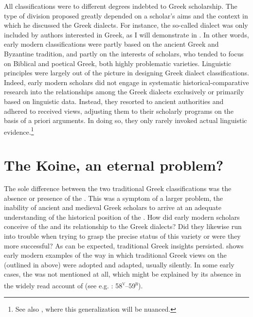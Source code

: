 All classifications were to different degrees indebted to Greek scholarship. The type of division proposed greatly depended on a scholar’s aims and the context in which he discussed the Greek dialects. For instance, the so-called  dialect was only included by authors interested in  Greek, as I will demonstrate in . In other words, early modern classifications were partly based on the ancient Greek and Byzantine tradition, and partly on the interests of scholars, who tended to focus on Biblical and poetical Greek, both highly problematic varieties. Linguistic principles were largely out of the picture in designing Greek dialect classifications. Indeed, early modern scholars did not engage in systematic historical-comparative research into the relationships among the Greek dialects exclusively or primarily based on linguistic data. Instead, they resorted to ancient authorities and adhered to received views, adjusting them to their scholarly programs on the basis of a priori arguments. In doing so, they only rarely invoked actual linguistic evidence.\footnote{See also , where this generalization will be nuanced.}

\section{The Koine, an eternal problem?}\label{sec:2.9}

The sole difference between the two traditional Greek classifications was the absence or presence of the . This was a symptom of a larger problem, the inability of ancient and medieval Greek scholars to arrive at an adequate understanding of the historical position of the . How did early modern scholars conceive of the  and its relationship to the Greek dialects? Did they likewise run into trouble when trying to grasp the precise status of this variety or were they more successful? As can be expected, traditional Greek insights persisted.  shows early modern examples of the way in which traditional Greek views on the  (outlined in  above) were adopted and adapted, usually silently. In some early cases, the  was not mentioned at all, which might be explained by its absence in the widely read account of  (see e.g. \citealt{Stapleton1566}: 58\textsc{\textsuperscript{v}}–59\textsc{\textsuperscript{r}}).

